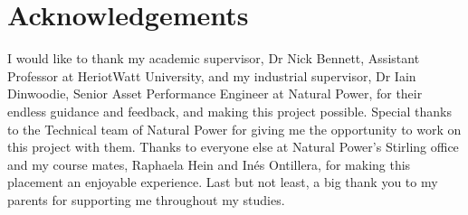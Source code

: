
\chapter{Acknowledgements}

I would like to thank my academic supervisor, Dr Nick Bennett, Assistant Professor at HeriotWatt University, and my industrial supervisor, Dr Iain Dinwoodie, Senior Asset Performance Engineer at Natural Power, for their endless guidance and feedback, and making this project possible. Special thanks to the Technical team of Natural Power for giving me the opportunity to work on this project with them. Thanks to everyone else at Natural Power's Stirling office and my course mates, Raphaela Hein and Inés Ontillera, for making this placement an enjoyable experience. Last but not least, a big thank you to my parents for supporting me throughout my studies.
